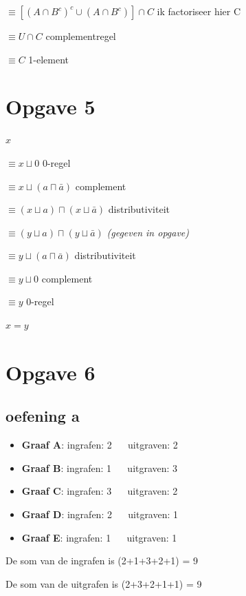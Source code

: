 \documentclass[11pt, a4paper]{article}
\begin{document}
$\equiv [{(A \cap B^c)}^c \cup (A \cap B^c)] \cap C$ \hfill ik factoriseer hier C

$\equiv U \cap C$ \hfill complementregel

$\equiv C$ \hfill 1-element





\pagebreak
\section*{Opgave 5}


$x$

$\equiv x \sqcup 0$ \hfill 0-regel

$\equiv x \sqcup (a \sqcap \bar{a})$ \hfill complement

$\equiv (x \sqcup a) \sqcap (x \sqcup \bar{a})$ \hfill distributiviteit

$\equiv (y \sqcup a) \sqcap (y \sqcup \bar{a})$ \hfill \textit{(gegeven in opgave)}

$\equiv y \sqcup (a \sqcap \bar{a})$ \hfill distributiviteit

$\equiv y \sqcup 0$ \hfill complement

$\equiv y$ \hfill 0-regel


$\boxed{x=y}$


\pagebreak
\section*{Opgave 6}

\subsection*{oefening a}

\begin{itemize}
	\item \textbf{Graaf A}: ingrafen: 2 $\quad$ uitgraven: 2
	\item \textbf{Graaf B}: ingrafen: 1 $\quad$ uitgraven: 3
	\item \textbf{Graaf C}: ingrafen: 3 $\quad$ uitgraven: 2
	\item \textbf{Graaf D}: ingrafen: 2 $\quad$ uitgraven: 1
	\item \textbf{Graaf E}: ingrafen: 1 $\quad$ uitgraven: 1
\end{itemize}

De som van de ingrafen is (2+1+3+2+1) = 9

De som van de uitgrafen is (2+3+2+1+1) = 9
\end{document}
